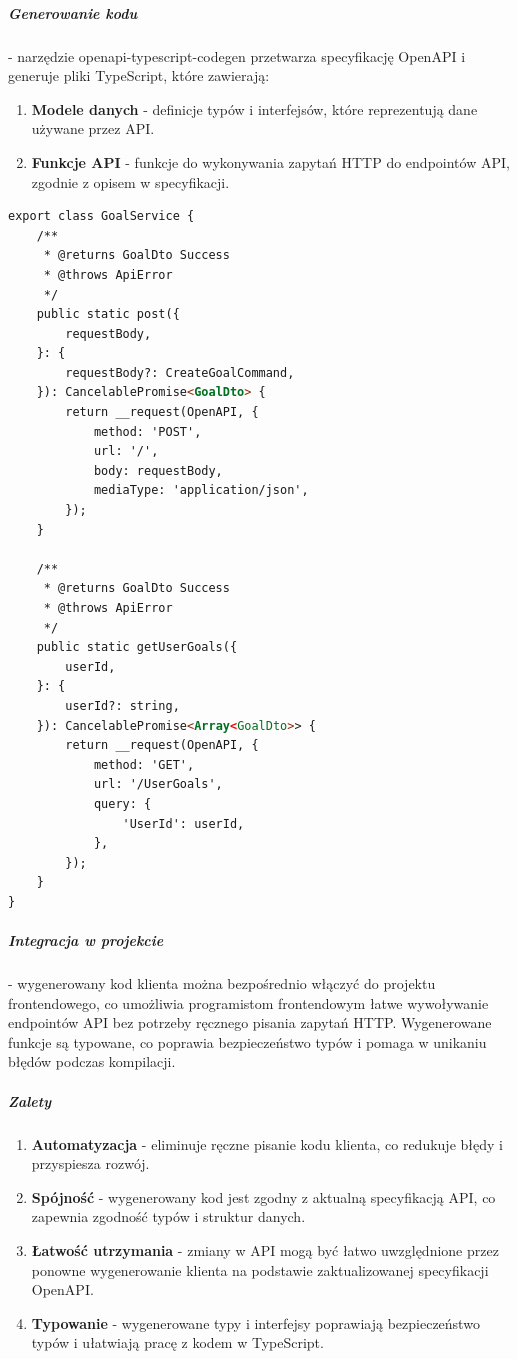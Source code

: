 \subparagraph{Generowanie kodu} - narzędzie openapi-typescript-codegen przetwarza specyfikację OpenAPI i generuje pliki TypeScript, które zawierają:

\begin{enumerate}
\item {\bf Modele danych} - definicje typów i interfejsów, które reprezentują dane używane przez API.
\item {\bf Funkcje API} - funkcje do wykonywania zapytań HTTP do endpointów API, zgodnie z opisem w specyfikacji.
\end{enumerate}

\begin{lstlisting}[language=html, caption=Przykład wygenerowanego kodu Typescript, linewidth=160mm]
export class GoalService {
    /**
     * @returns GoalDto Success
     * @throws ApiError
     */
    public static post({
        requestBody,
    }: {
        requestBody?: CreateGoalCommand,
    }): CancelablePromise<GoalDto> {
        return __request(OpenAPI, {
            method: 'POST',
            url: '/',
            body: requestBody,
            mediaType: 'application/json',
        });
    }

    /**
     * @returns GoalDto Success
     * @throws ApiError
     */
    public static getUserGoals({
        userId,
    }: {
        userId?: string,
    }): CancelablePromise<Array<GoalDto>> {
        return __request(OpenAPI, {
            method: 'GET',
            url: '/UserGoals',
            query: {
                'UserId': userId,
            },
        });
    }
}
\end{lstlisting}

\subparagraph{Integracja w projekcie} - wygenerowany kod klienta można bezpośrednio włączyć do projektu frontendowego, co umożliwia programistom frontendowym łatwe wywoływanie endpointów API bez potrzeby ręcznego pisania zapytań HTTP. Wygenerowane funkcje są typowane, co poprawia bezpieczeństwo typów i pomaga w unikaniu błędów podczas kompilacji.

\subparagraph{Zalety}

\begin{enumerate}
\item {\bf Automatyzacja} - eliminuje ręczne pisanie kodu klienta, co redukuje błędy i przyspiesza rozwój.
\item {\bf Spójność} - wygenerowany kod jest zgodny z aktualną specyfikacją API, co zapewnia zgodność typów i struktur danych.
\item {\bf Łatwość utrzymania} - zmiany w API mogą być łatwo uwzględnione przez ponowne wygenerowanie klienta na podstawie zaktualizowanej specyfikacji OpenAPI.
\item {\bf Typowanie} - wygenerowane typy i interfejsy poprawiają bezpieczeństwo typów i ułatwiają pracę z kodem w TypeScript.
\end{enumerate}

